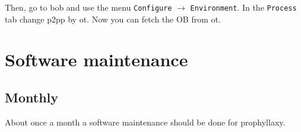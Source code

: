 \documentclass[11pt,fleqn]{book}
\begin{document}
Then, go to \gls{bob} and use the menu \texttt{Configure} $\rightarrow$ \texttt{Environment}. In the \texttt{Process} tab change \gls{p2pp} by \gls{ot}. Now you can fetch the OB from \gls{ot}.




\chapter{Software maintenance}
\label{chap:reboots}

\section{Monthly}

About once a month a software maintenance should be done for prophyllaxy.
\end{document}
